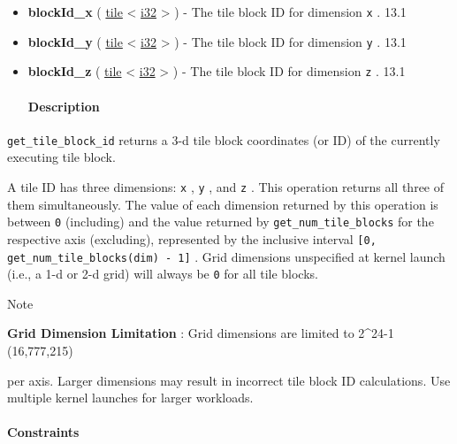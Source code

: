 \documentclass{article}
\begin{document}
\begin{itemize}
\item \textbf{blockId\_x} ( \href{https://docs.nvidia.com/cuda/tile-ir/latest/sections/types.html#type-tile}{tile} < \href{https://docs.nvidia.com/cuda/tile-ir/latest/sections/types.html#subsection-element-types}{i32} > ) - The tile block ID for dimension \texttt{x} . 13.1
\item \textbf{blockId\_y} ( \href{https://docs.nvidia.com/cuda/tile-ir/latest/sections/types.html#type-tile}{tile} < \href{https://docs.nvidia.com/cuda/tile-ir/latest/sections/types.html#subsection-element-types}{i32} > ) - The tile block ID for dimension \texttt{y} . 13.1
\item \textbf{blockId\_z} ( \href{https://docs.nvidia.com/cuda/tile-ir/latest/sections/types.html#type-tile}{tile} < \href{https://docs.nvidia.com/cuda/tile-ir/latest/sections/types.html#subsection-element-types}{i32} > ) - The tile block ID for dimension \texttt{z} . 13.1


\paragraph{Description}

\end{itemize}
\texttt{get\_tile\_block\_id} returns a 3-d tile block coordinates (or ID) of the currently executing tile block.


A tile ID has three dimensions: \texttt{x} , \texttt{y} , and \texttt{z} . This operation returns all three of them simultaneously. The value of each dimension returned by this operation is between \texttt{0} (including) and the value returned by \texttt{get\_num\_tile\_blocks} for the respective axis (excluding), represented by the inclusive interval \texttt{[0, get\_num\_tile\_blocks(dim) - 1]} . Grid dimensions unspecified at kernel launch (i.e., a 1-d or 2-d grid) will always be \texttt{0} for all tile blocks.


Note


\textbf{Grid Dimension Limitation} : Grid dimensions are limited to 2\textasciicircum{}24-1 (16,777,215)

per axis. Larger dimensions may result in incorrect tile block ID calculations. Use multiple kernel launches for larger workloads.



\paragraph{Constraints}
\end{document}

